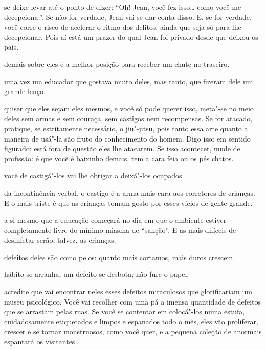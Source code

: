 \pagebreak
\thispagestyle{empty}
\movetooddpage

 se deixe levar até o ponto de dizer: ``Oh! Jean, você fez isso\ldots{}
como você me decepciona.''. Se não for verdade, Jean vai se dar conta
disso. E, se for verdade, você corre o risco de acelerar o ritmo dos
delitos, ainda que seja só para lhe decepcionar. Pois aí está um prazer
do qual Jean foi privado desde que deixou os pais.



 demais sobre eles é a melhor posição para receber um chute
no traseiro.



 uma vez um educador que gostava muito deles, mas tanto, que fizeram
dele um grande lenço.



 quiser que eles sejam eles mesmos, e você só pode querer isso,
meta"-se no meio deles sem armas e sem couraça, sem castigos nem
recompensas. Se for atacado, pratique, se estritamente necessário, o
jiu"-jitsu, pois tanto essa arte quanto a maneira de usá"-la são fruto do
conhecimento do homem. Digo isso em sentido figurado: está fora de
questão eles lhe atacarem. Se isso acontecer, mude de profissão: é que
você é baixinho demais, tem a cara feia ou os pés chatos.

\pagebreak

 você de castigá"-los vai lhe obrigar a deixá"-los ocupados.



 da incontinência verbal, o castigo é a arma mais cara aos
corretores de crianças. E o mais triste é que as crianças tomam gosto
por esses vícios de gente grande.



 a si mesmo que a educação começará no dia em que o ambiente estiver
completamente livre do mínimo miasma de ``sanção''. E as mais difíceis
de desinfetar serão, talvez, as crianças.



 defeitos deles são como pelos: quanto mais cortamos, mais duros
crescem.



 hábito se arranha, um defeito se desbota; não fure o papel.

\pagebreak

 acredite que vai encontrar neles esses defeitos miraculosos que
glorificariam um museu psicológico. Você vai recolher com uma pá a
imensa quantidade de defeitos que se arrastam pelas ruas. Se você se
contentar em colocá"-los numa estufa, cuidadosamente etiquetados e limpos
e espanados todo o mês, eles vão proliferar, crescer e se tornar
monstruosos, como você quer, e a pequena coleção de anormais espantará
os visitantes.



